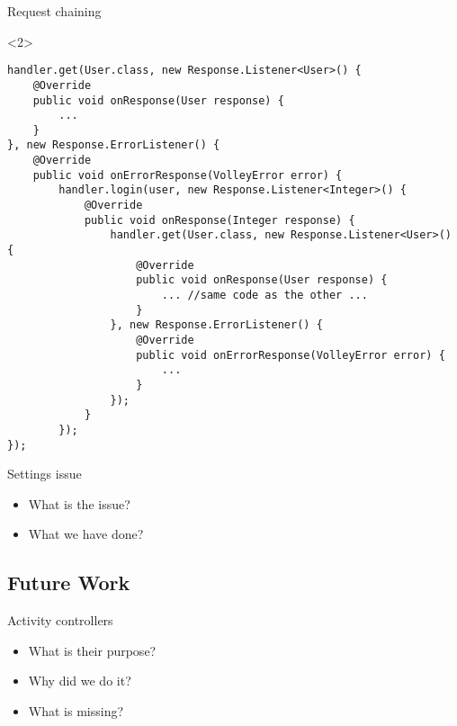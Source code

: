 \begin{frame}[fragile]{Request chaining}
\begin{onlyenv}<2>
\begin{center}
\begin{minipage}[H]{0.9\linewidth}
\begin{lstlisting}    
handler.get(User.class, new Response.Listener<User>() {
	@Override
    public void onResponse(User response) {
    	... 
    }
}, new Response.ErrorListener() {
	@Override
    public void onErrorResponse(VolleyError error) {
    	handler.login(user, new Response.Listener<Integer>() {
        	@Override
            public void onResponse(Integer response) {
            	handler.get(User.class, new Response.Listener<User>() {
                	@Override
                    public void onResponse(User response) {
                    	... //same code as the other ...
                    }
                }, new Response.ErrorListener() {
                    @Override
                    public void onErrorResponse(VolleyError error) {
						...
                    }
                });
            }
        });
});
\end{lstlisting} 
\end{minipage}
\end{center}
\end{onlyenv}
\end{frame}


\begin{frame}{Settings issue}
\begin{itemize}
  \item What is the issue?
  \item What we have done?
\end{itemize}
\end{frame}

\subsection{Future Work}
\begin{frame}{Activity controllers}
\begin{itemize}
  \item What is their purpose?
  \item Why did we do it?
  \item What is missing?
\end{itemize}
\end{frame}

